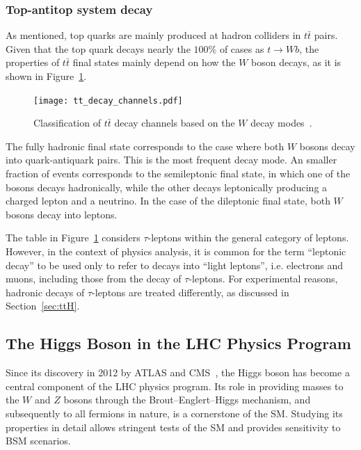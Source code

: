 \subsubsection*{Top-antitop system decay}
\label{subsec:top_quark_decay}

As mentioned, top quarks are mainly produced at hadron colliders in $t\bar{t}$ pairs. Given that the top quark decays nearly the $100\%$ of cases as $t\rightarrow Wb$, the properties of $t\bar{t}$ final states mainly depend on how the $W$ boson decays, as it is shown in Figure~\ref{fig:diagram-top}.
\begin{figure}[htbp]
    \centering
    \texttt{[image: tt\_decay\_channels.pdf]}
    \caption{Classification of $t\bar{t}$ decay channels based on the $W$ decay modes~\cite{Lannon_2012}.}
    \label{fig:diagram-top}
\end{figure}

The fully hadronic final state corresponds to the case where both $W$ bosons decay into quark-antiquark pairs. This is the most frequent decay mode. An smaller fraction of events corresponds to the semileptonic final state, in which one of the bosons decays hadronically, while the other decays leptonically producing a charged lepton and a neutrino. In the case of the dileptonic final state, both $W$ bosons decay into leptons.

The table in Figure~\ref{fig:diagram-top} considers $\tau$-leptons within the general category of leptons. However, in the context of physics analysis, it is common for the term ``leptonic decay'' to be used only to refer to decays into ``light leptons'', i.e. electrons and muons, including those from the decay of $\tau$-leptons. For experimental reasons, hadronic decays of $\tau$-leptons are treated differently, as discussed in Section~\ref{sec:ttH}.

\subsection{The Higgs Boson in the LHC Physics Program}
\label{sec:higgs_program}

Since its discovery in 2012 by ATLAS and CMS~\cite{ATLAS:2012yve,CMS:2012qbp}, the Higgs boson has become a central component of the LHC physics program. Its role in providing masses to the $W$ and $Z$ bosons through the Brout–Englert–Higgs mechanism, and subsequently to all fermions in nature, is a cornerstone of the SM. Studying its properties in detail allows stringent tests of the SM and provides sensitivity to BSM scenarios.

